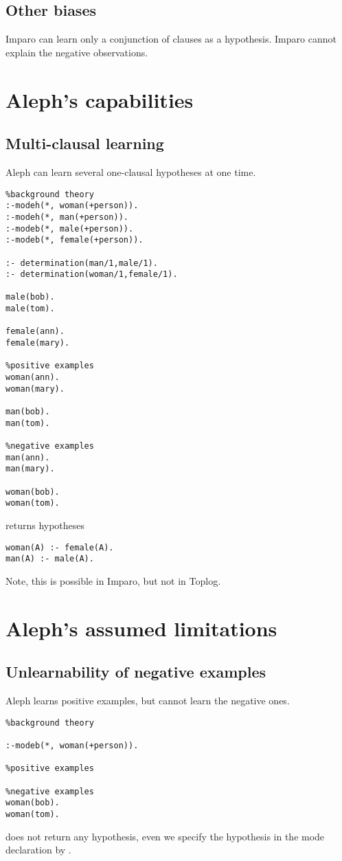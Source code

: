 \subsection{Other biases}
Imparo can learn only a conjunction of clauses as a hypothesis.
Imparo cannot explain the negative observations.

\section{Aleph's capabilities}

\subsection{Multi-clausal learning}
Aleph can learn several one-clausal hypotheses at one time.

\begin{lstlisting}
%background theory
:-modeh(*, woman(+person)).
:-modeh(*, man(+person)).
:-modeb(*, male(+person)).
:-modeb(*, female(+person)).

:- determination(man/1,male/1).
:- determination(woman/1,female/1).

male(bob).
male(tom).

female(ann).
female(mary).

%positive examples
woman(ann).
woman(mary).

man(bob).
man(tom).

%negative examples
man(ann).
man(mary).

woman(bob).
woman(tom).
\end{lstlisting}

returns hypotheses

\begin{lstlisting}
woman(A) :- female(A).
man(A) :- male(A).
\end{lstlisting}

Note, this is possible in Imparo, but not in Toplog.

\section{Aleph's assumed limitations}
\subsection{Unlearnability of negative examples}
Aleph learns positive examples, but cannot learn the negative ones.
\begin{lstlisting}
%background theory

:-modeb(*, woman(+person)).

%positive examples

%negative examples
woman(bob).
woman(tom).
\end{lstlisting}
does not return any hypothesis, even we specify the hypothesis in the mode declaration by .

